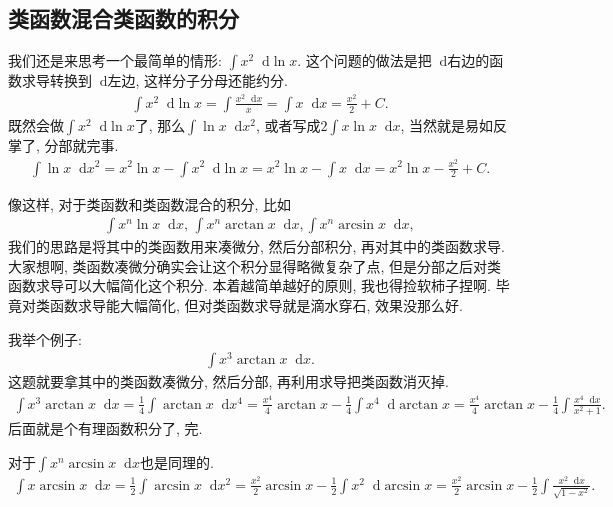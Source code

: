 \documentclass{ctexbook}
\newcommand*{\dif}{\mathop{}\!\mathrm{d}}
\begin{document}
{\subsection{\uppercase\expandafter{}类函数混合\uppercase\expandafter{}类函数的积分}
我们还是来思考一个最简单的情形: $\int x^{2}\dif{\ln{x}}$. 这个问题的做法是把$\dif$右边的函数求导转换到$\dif$左边, 这样分子分母还能约分. 
\begin{align*}
\int x^{2}\dif{\ln{x}}=\int\frac{x^{2}\dif{x}}{x}=\int x\dif{x}=\frac{x^{2}}{2}+C
.\end{align*}
既然会做$\int x^{2}\dif{\ln{x}}$了, 那么$\int\ln{x}\dif{x^{2}}$, 或者写成$2\int x\ln{x}\dif{x}$, 当然就是易如反掌了, 分部就完事. 
\begin{align*}
\int\ln{x}\dif{x^{2}}=x^{2}\ln{x}-\int x^{2}\dif{\ln{x}}=x^{2}\ln{x}-\int x\dif{x}=x^{2}\ln{x}-\frac{x^{2}}{2}+C
.\end{align*}\par
像这样, 对于\uppercase\expandafter{}类函数和\uppercase\expandafter{}类函数混合的积分, 比如
\begin{align*}
\int x^{n}\ln{x}\dif{x},\,\int x^{n}\arctan{x}\dif{x},\int x^{n}\arcsin{x}\dif{x}
,\end{align*}
我们的思路是将其中的\uppercase\expandafter{}类函数用来凑微分, 然后分部积分, 再对其中的\uppercase\expandafter{}类函数求导. 大家想啊, \uppercase\expandafter{}类函数凑微分确实会让这个积分显得略微复杂了点, 但是分部之后对\uppercase\expandafter{}类函数求导可以大幅简化这个积分. 本着越简单越好的原则, 我也得捡软柿子捏啊. 毕竟对\uppercase\expandafter{}类函数求导能大幅简化, 但对\uppercase\expandafter{}类函数求导就是滴水穿石, 效果没那么好. \par
我举个例子: 
\begin{align*}
\int x^{3}\arctan{x}\dif{x}
.\end{align*}
这题就要拿其中的\uppercase\expandafter{}类函数凑微分, 然后分部, 再利用求导把\uppercase\expandafter{}类函数消灭掉. 
\begin{align*}
\int x^{3}\arctan{x}\dif{x}=\frac{1}{4}\int\arctan{x}\dif{x^{4}}=\frac{x^{4}}{4}\arctan{x}-\frac{1}{4}\int x^{4}\dif{\arctan{x}}=\frac{x^{4}}{4}{\arctan{x}}-\frac{1}{4}\int\frac{x^{4}\dif{x}}{x^{2}+1}
.\end{align*}
后面就是个有理函数积分了, 完. \par
对于$\int x^{n}\arcsin{x}\dif{x}$也是同理的. 
\begin{align*}
\int x\arcsin{x}\dif{x}=\frac{1}{2}\int\arcsin{x}\dif{x^{2}}=\frac{x^{2}}{2}\arcsin{x}-\frac{1}{2}\int x^{2}\dif{\arcsin{x}}=\frac{x^{2}}{2}\arcsin{x}-\frac{1}{2}\int\frac{x^{2}\dif{x}}{\sqrt{1-x^{2}}}
.\end{align*}\par
}
\end{document}
